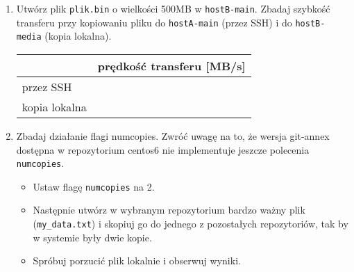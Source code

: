 \documentclass[polish]{article}
\newif\ifteacher
\begin{document}
\begin{enumerate}
    \item
    Utwórz plik \texttt{plik.bin} o wielkości 500MB w \texttt{hostB-main}.
    Zbadaj szybkość
    transferu przy kopiowaniu pliku do \texttt{hostA-main} (przez SSH) i do
    \texttt{hostB-media} (kopia lokalna).

    \begin{tabular}{|l|p{}|}
    \hline
    & prędkość transferu [MB/s] \\
    \hline
    przez SSH & \\
    \hline
    kopia lokalna & \\
    \hline
    \end{tabular}

\ifteacher
    \begin{lstlisting}[frame=single, caption=Wynik]
hostB:hostB-main.git$ dd if=/dev/zero of=large.bin bs=1024 count=500000
hostB:hostB-main.git$ git annex add large.bin
hostB:hostB-main.git$ git commit -m "Added large.bin"

# wyniki: 45MBps SSH, 115MBps LOCAL


[root@lab429-08 hostB-main.git]# git annex copy --to hostA-main plik.bin
copy plik.bin (checking hostA-main...) (to hostA-main...) SHA256-s512000000--4c98cf638799a07eb85872e7f5f5d8d661c09e6e15af02f3655ed9250cae13b0
512000000 100\% 45.98MB/s 0:00:10 (xfer#1, to-check=0/1)

sent 512062644 bytes received 31 bytes 48767873.81 bytes/sec
total size is 512000000 speedup is 1.00
ok
(Recording state in git...)


[root@lab429-08 hostB-main.git]# git annex copy --to hostB-backup plik.bin
copy plik.bin (to hostB-backup...) SHA256-s512000000--4c98cf638799a07eb85872e7f5f5d8d661c09e6e15af02f3655ed9250cae13b0
512000000 100\% 115.10MB/s 0:00:04 (xfer#1, to-check=0/1)

sent 512062644 bytes received 31 bytes 113791705.56 bytes/sec
total size is 512000000 speedup is 1.00
ok
(Recording state in git...)
    \end{lstlisting}
\fi

    \item
    Zbadaj działanie flagi numcopies. Zwróć uwagę na to, że wersja git-annex
    dostępna w repozytorium centos6 nie implementuje jeszcze polecenia
    \texttt{numcopies}.

    \begin{itemize}
        \item Ustaw flagę \texttt{numcopies} na 2.
        \item Następnie utwórz w wybranym repozytorium bardzo ważny plik
              (\texttt{my\_data.txt}) i skopiuj go do jednego z pozostałych
              repozytoriów, tak by w systemie były dwie kopie.
        \item Spróbuj porzucić plik lokalnie i obserwuj wyniki.
    \end{itemize}


\end{enumerate}
\end{document}
